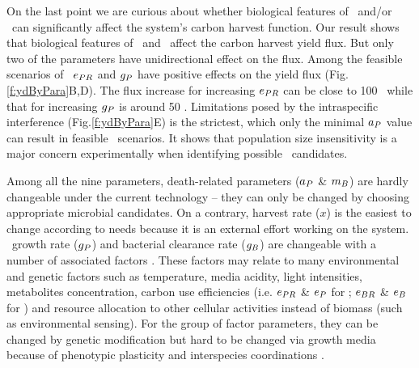 \documentclass[../thesis.tex]{subfiles} %
\begin{document}
On the last point we are curious about whether biological features of \phy\ and/or \bac\ can significantly affect the system’s carbon harvest function.  Our result shows that biological features of \phy\ and \bac\ affect the carbon harvest yield flux.  But only two of the parameters have unidirectional effect on the flux.  Among the feasible scenarios of \PBH\, $e_{PR}$ and $g_P$ have positive effects on the yield flux (Fig.\ref{f:ydByPara}B,D).  The flux increase for increasing $e_{PR}$ can be close to 100 \dxdt\ while that for increasing $g_P$ is around 50 \dxdt.  Limitations posed by the intraspecific interference (Fig.\ref{f:ydByPara}E) is the strictest, which only the minimal $a_P$ value can result in feasible \PBH\ scenarios.  It shows that population size insensitivity is a major concern experimentally when identifying possible \phy\ candidates.

Among all the nine parameters, death-related parameters ($a_P$ \& $m_B$) are hardly changeable under the current technology -- they can only be changed by choosing appropriate microbial candidates.  On a contrary, harvest rate ($x$) is the easiest to change according to needs because it is an external effort working on the system.  \Phy\ growth rate ($g_P$) and bacterial clearance rate ($g_B$) are changeable with a number of associated factors \autocite{park2020potential}.  These factors may relate to many environmental and genetic factors such as temperature, media acidity, light intensities, metabolites concentration, carbon use efficiencies (i.e. $e_{PR}$ \& $e_P$ for \phy; $e_{BR}$ \& $e_B$ for \bac) and resource allocation to other cellular activities instead of biomass (such as environmental sensing).  For the group of factor parameters, they can be changed by genetic modification \autocite{moniruzzaman1996ethanol} but hard to be changed via growth media because of phenotypic plasticity \autocite{j1989respiration,bratbak1985phytoplankton,samejima1958heterotrophic} and interspecies coordinations \autocite{beliaev2014inference,amin2012interactions}.
\end{document}
